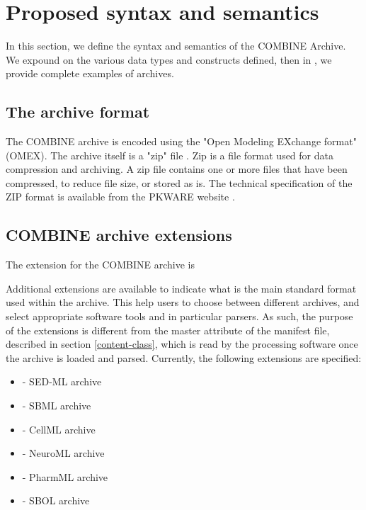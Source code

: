 
\section{Proposed syntax and semantics}
\label{syntax}

In this section, we define the syntax and semantics of the COMBINE 
Archive. We expound on the various data types and constructs defined, 
then in , we provide complete examples of archives. 

\subsection{The archive format}

The COMBINE archive is encoded using the "{O}pen 
{M}odeling {EX}change format" (OMEX). The archive itself is a "zip" file \cite{zipFile}. Zip is a file format used for data compression and archiving. A zip file contains one or more files that have been compressed, to reduce file size, or stored as is. The technical specification of the ZIP format is available from the PKWARE website \cite{zipSpec}.

\subsection{COMBINE archive extensions}
\label{combine-archive-extensions}
The extension for the COMBINE archive is 

Additional extensions are available to indicate what is the main standard format used within the archive. This help users to choose between different archives, and select appropriate software tools and in particular parsers. As such, the purpose of the extensions is different from the master attribute of the manifest file, described in section \ref{content-class}, which is read by the processing software once the archive is loaded and parsed. Currently, the following extensions are specified:

\begin{itemize}
	\item { - SED-ML archive} \citep{Waltemath:2011}
	\item { - SBML archive} \citep{hucka:2003}
	\item { - CellML archive} \citep{Cuellar:2003}
	\item { - NeuroML archive} \citep{Gleeson:2010}
	\item { - PharmML archive} \citep{Moodie:2013}
        \item { - SBOL archive} \citep{Galdzicki:2014}
\end{itemize}

